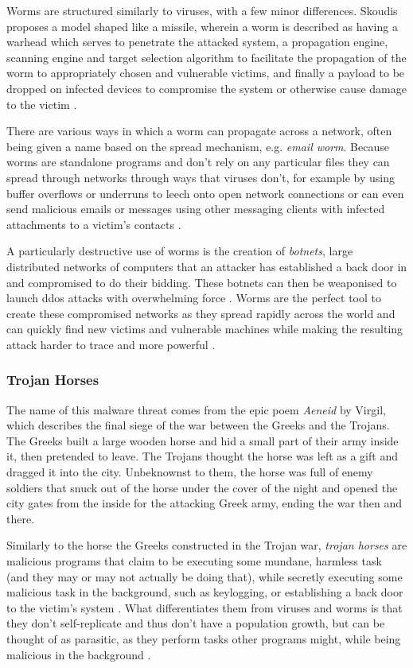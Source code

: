 Worms are structured similarly to viruses, with a few minor differences. Skoudis proposes a model shaped like a missile,
wherein a worm is described as having a warhead which serves to penetrate the attacked system, a propagation engine,
scanning engine and target selection algorithm to facilitate the propagation of the worm to appropriately chosen and
vulnerable victims, and finally a payload to be dropped on infected devices to compromise the system or otherwise cause
damage to the victim \cite{skoudis-book}.

There are various ways in which a worm can propagate across a network, often being given a name based on the spread 
mechanism, e.g. \emph{email worm}. Because worms are standalone programs and don't rely on any particular files they can
spread through networks through ways that viruses don't, for example by using buffer overflows or underruns to leech
onto open network connections or can even send malicious emails or messages using other messaging clients with infected 
attachments to a victim's contacts \cite{skoudis-book, aycock-book}.

A particularly destructive use of worms is the creation of \emph{botnets}, large distributed networks of computers that
an attacker has established a back door in and compromised to do their bidding. These botnets can then be weaponised to
launch \acrfull{ddos} attacks with overwhelming force \cite{skoudis-book}. Worms are the perfect tool to create these
compromised networks as they spread rapidly across the world and can quickly find new victims and vulnerable machines
while making the resulting attack harder to trace and more powerful \cite{skoudis-book}.

\subsubsection{Trojan Horses}
The name of this malware threat comes from the epic poem \emph{Aeneid} by Virgil, which describes the final siege of the 
war between the Greeks and the Trojans. The Greeks built a large wooden horse and hid a small part of their army inside
it, then pretended to leave. The Trojans thought the horse was left as a gift and dragged it into the city. Unbeknownst
to them, the horse was full of enemy soldiers that snuck out of the horse under the cover of the night and opened the
city gates from the inside for the attacking Greek army, ending the war then and there.

Similarly to the horse the Greeks constructed in the Trojan war, \emph{trojan horses} are malicious programs that
claim to be executing some mundane, harmless task (and they may or may not actually be doing that), while secretly 
executing some malicious task in the background, such as keylogging, or establishing a back door to the victim's system 
\cite[p.~12-13]{viruses-revealed-book, aycock-book}. 
What differentiates them from viruses and worms is that they don't self-replicate and thus don't have a population growth, 
but can be thought of as parasitic, as they perform tasks other programs might, while being malicious in the background 
\cite[p.~12]{aycock-book}. 

